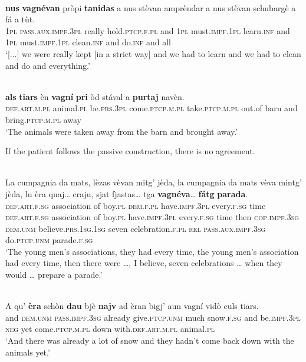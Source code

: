 \ea\label{}
\\
\gll    [...] \textbf{nus} \textbf{vagnévan} pròpi \textbf{tanidas} a nus stèvan amprèndar a nus stèvan ṣchubargè a fá a tùt.\\
{} \textsc{1pl} \textsc{pass.aux.impf.3pl} really hold.\textsc{ptcp.f.pl} and \textsc{1pl} must.\textsc{impf.1pl} learn.\textsc{inf} and \textsc{1pl}  must.\textsc{impf.1pl} clean.\textsc{inf} and do.\textsc{inf} and all\\
\glt `[...] we were really kept [in a strict way] and we had to learn and we had to clean and do and everything.'
\z

\ea\label{}
 {\citealt[53]{Büchli1966}}\\
\gll    [...] \textbf{als} \textbf{tiars} èn \textbf{vagní} \textbf{pri} òd stával a \textbf{purtaj} navèn.\\
{}    \textsc{def.art.m.pl}  animal.\textsc{pl}  be.\textsc{prs.3pl}   come.\textsc{ptcp.m.pl}   take.\textsc{ptcp.m.pl}  out.of barn and bring.\textsc{ptcp.m.pl}  away\\
\glt `The animals were taken away from the barn and brought away.'
\z

If the patient follows the passive construction, there is no agreement.

\ea\label{}
\\
\gll    La cumpagnia da mats, lèzas vèvan mitg’ jèda, la cumpagnia da mats vèva mintg’ jèda, lu èra quaj… craju, sjat fjastas… tga \textbf{vagnéva}… \textbf{fátg} \textbf{parada}.\\
\textsc{def.art.f.sg} association of boy.\textsc{pl} \textsc{dem.f.pl} have.\textsc{impf.3pl} every.\textsc{f.sg} time \textsc{def.art.f.sg} association of boy.\textsc{pl} have.\textsc{impf.3pl} every.\textsc{f.sg} time then \textsc{cop.impf.3sg} \textsc{dem.unm} believe.\textsc{prs.1sg.1sg} seven celebration.\textsc{f.pl} \textsc{rel} \textsc{pass.aux.impf.3sg} do.\textsc{ptcp.unm} parade.\textsc{f.sg}\\
\glt `The young men's associations, they had every time, the young men's association had every time, then there were …, I believe, seven celebrations … when they would … prepare a parade.'
\z

\ea\label{}
\\
\gll A qu' \textbf{èra} schòn \textbf{dau} bjè \textbf{najv} ad èran bigj’ aun vagní vidò culs tiars.\\  
and \textsc{dem.unm} \textsc{pass.impf.3sg} already give.\textsc{ptcp.unm} much snow.\textsc{f.sg} and be.\textsc{impf.3pl} \textsc{neg} yet come.\textsc{ptcp.m.pl} down with.\textsc{def.art.m.pl} animal.\textsc{pl} \\
\glt `And there was already a lot of snow and they hadn’t come back down with the animals yet.'
\z

